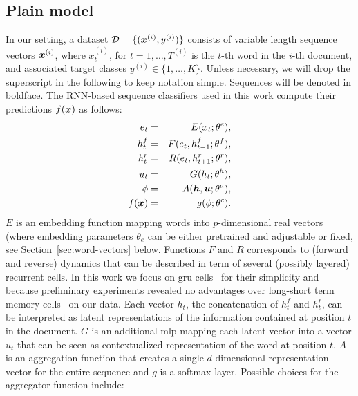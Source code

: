 \subsection{Plain model}
\label{sec:model}
In our setting, a dataset $\mathcal{D}=\{(\bm{x}^{(i)},y^{(i)})\}$
consists of variable length sequence vectors $\bm{x}^{(i)}$, where
$x^{(i)}_t$, for $t=1,\dots,T^{(i)}$ is the $t$-th word in the $i$-th
document, and associated target classes
$y^{(i)}\in\{1,\dots,K\}$. Unless necessary, we will drop the
superscript in the following to keep notation simple.  Sequences will
be denoted in boldface. The RNN-based sequence classifiers used in
this work compute their predictions $f(\bm{x})$ as follows:
\begin{align}
  e_t &=& E(x_t;\theta^e),\label{eq:embed}\\
  h^f_t &=& F(e_t,h^f_{t-1};\theta^f),\label{eq:maxModelRL}\\  
  h^r_t &=& R(e_t,h^r_{t+1};\theta^r),\label{eq:maxModelRR}\\
  u_t &=& G(h_t;\theta^h),\label{eq:maxModelF}\\
  \phi & =& A(\bm{h},\bm{u};\theta^a),\label{eq:aggregation}\\
  f(\bm{x}) &=& g(\phi;\theta^c).\label{eq:maxModelC}
\end{align}
$E$ is an embedding function mapping words into $p$-dimensional real
vectors (where embedding parameters $\theta_e$ can be either
pretrained and adjustable or fixed, see Section~\ref{sec:word-vectors}
below.  Functions $F$ and $R$ corresponds to (forward and reverse)
dynamics that can be described in term of several (possibly layered)
recurrent cells. In this work we focus on \ac{gru}
cells~\cite{cho2014properties} for their simplicity and because
preliminary experiments revealed no advantages over long-short term
memory cells~\cite{hochreiter1997long} on our data. Each vector $h_t$,
the concatenation of $h^f_t$ and $h^r_t$, can be interpreted as latent
representations of the information contained at position $t$ in the
document. $G$ is an additional \ac{mlp} mapping each latent vector into a
vector $u_t$ that can be seen as contextualized representation of the
word at position $t$. $A$ is an aggregation function that creates a
single $d$-dimensional representation vector for the entire sequence
and $g$ is a softmax layer. Possible choices for the aggregator
function include:
